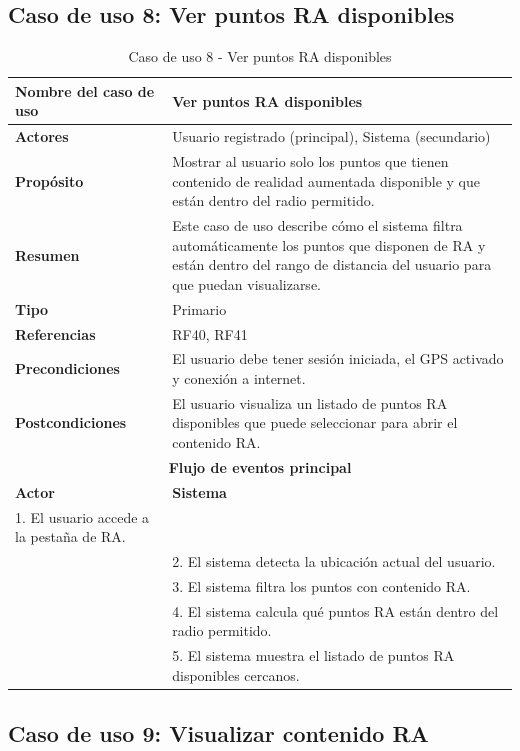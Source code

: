 \clearpage
\subsection{Caso de uso 8: Ver puntos RA disponibles}

\begin{table}[H]
\centering
\caption{Caso de uso 8 - Ver puntos RA disponibles}
\begin{tabular}{|p{4.5cm}|p{10.5cm}|}
\hline
\textbf{Nombre del caso de uso} & Ver puntos RA disponibles \\
\hline
\textbf{Actores} & Usuario registrado (principal), Sistema (secundario) \\
\hline
\textbf{Propósito} & Mostrar al usuario solo los puntos que tienen contenido de realidad aumentada disponible y que están dentro del radio permitido. \\
\hline
\textbf{Resumen} & Este caso de uso describe cómo el sistema filtra automáticamente los puntos que disponen de RA y están dentro del rango de distancia del usuario para que puedan visualizarse. \\
\hline
\textbf{Tipo} & Primario \\
\hline
\textbf{Referencias} & RF40, RF41 \\
\hline
\textbf{Precondiciones} & El usuario debe tener sesión iniciada, el GPS activado y conexión a internet. \\
\hline
\textbf{Postcondiciones} & El usuario visualiza un listado de puntos RA disponibles que puede seleccionar para abrir el contenido RA. \\
\hline
\multicolumn{2}{|c|}{\textbf{Flujo de eventos principal}} \\
\hline
\textbf{Actor} & \textbf{Sistema} \\
\hline
1. El usuario accede a la pestaña de RA. & \\
\hline
& 2. El sistema detecta la ubicación actual del usuario. \\
\hline
& 3. El sistema filtra los puntos con contenido RA. \\
\hline
& 4. El sistema calcula qué puntos RA están dentro del radio permitido. \\
\hline
& 5. El sistema muestra el listado de puntos RA disponibles cercanos. \\
\hline
\end{tabular}
\end{table}

\clearpage
\subsection{Caso de uso 9: Visualizar contenido RA}

